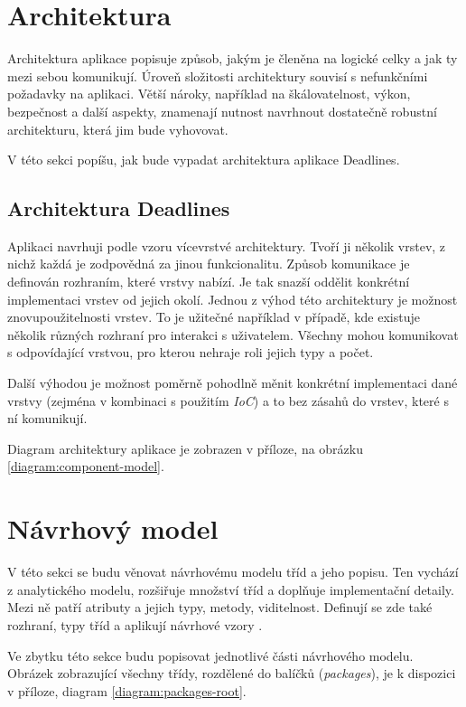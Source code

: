 \documentclass[thesis=B,czech]{FITthesis}[2012/06/26]
\begin{document}
	\section{Architektura}
		Architektura aplikace popisuje způsob, jakým je členěna na logické celky a jak ty mezi sebou komunikují. Úroveň složitosti architektury souvisí s nefunkčními požadavky na aplikaci. Větší nároky, například na škálovatelnost, výkon, bezpečnost a další aspekty, znamenají nutnost navrhnout dostatečně robustní architekturu, která jim bude vyhovovat. 
		
		V této sekci popíšu, jak bude vypadat architektura aplikace Deadlines.
		
	\subsection{Architektura Deadlines}	
		Aplikaci navrhuji podle vzoru vícevrstvé architektury. Tvoří ji několik vrstev, z nichž každá je zodpovědná za jinou funkcionalitu. Způsob komunikace je definován rozhraním, které vrstvy nabízí. Je tak snazší oddělit konkrétní implementaci vrstev od jejich okolí. Jednou z výhod této architektury je možnost znovupoužitelnosti vrstev. To je užitečné například v případě, kde existuje několik různých rozhraní pro interakci s uživatelem. Všechny mohou komunikovat s odpovídající vrstvou, pro kterou nehraje roli jejich typy a počet.
		
		Další výhodou je možnost poměrně pohodlně měnit konkrétní implementaci dané vrstvy (zejména v kombinaci s použitím \textit{IoC}) a to bez zásahů do vrstev, které s ní komunikují. 
		
		Diagram architektury aplikace je zobrazen v příloze, na obrázku \ref{diagram:component-model}. 
		
	\section{Návrhový model}
		V této sekci se budu věnovat návrhovému modelu tříd a jeho popisu. Ten vychází z analytického modelu, rozšiřuje množství tříd a doplňuje implementační detaily. Mezi ně patří atributy a jejich typy, metody, viditelnost. Definují se zde také rozhraní, typy tříd a aplikují návrhové vzory \cite{navrhovy-model}.
		
		Ve zbytku této sekce budu popisovat jednotlivé části návrhového modelu. Obrázek zobrazující všechny třídy, rozdělené do balíčků (\textit{packages}), je k dispozici v příloze, diagram \ref{diagram:packages-root}.
		
\end{document}
